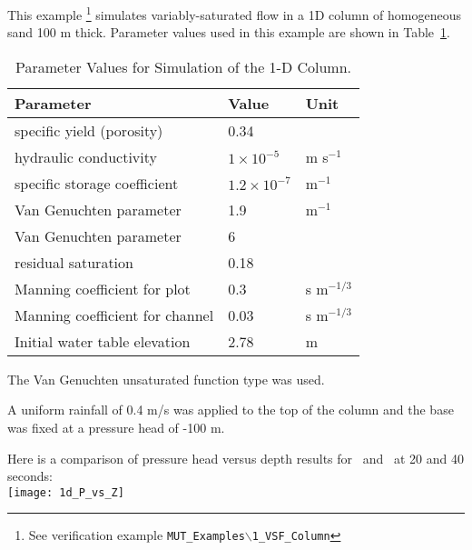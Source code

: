 \label{section:1d_column_example}
This example \footnote{See verification example   \texttt{MUT\_Examples$\backslash$1\_VSF\_Column}} simulates variably-saturated flow in a 1D column of homogeneous sand 100 m thick.
Parameter values used in this example are shown in Table~\ref{tab:column}.
    \begin{table}
        \centering
        \caption{Parameter Values for Simulation of the 1-D Column.}
        \begin{tabular}{lll}  \hline
            Parameter                             & Value & Unit                           \\ \hline
            specific yield (porosity)             &  0.34                    &             \\
            hydraulic conductivity                &  $ 1 \times 10^{-5}$     &m s$^{-1}$  \\
            specific storage coefficient          &  $ 1.2 \times 10^{-7}$   & m$^{-1}$   \\
            Van Genuchten parameter               &  1.9                     &m$^{-1}$     \\
            Van Genuchten parameter               &  6                       &             \\
            residual saturation                   &  0.18                    &             \\
            Manning coefficient for plot          &  0.3                     &s m$^{-1/3}$ \\
            Manning coefficient for channel       &  0.03                    &s m$^{-1/3}$ \\
            Initial water table elevation         &  2.78                    &m            \\
        \hline
        \end{tabular}
        \label{tab:column}
    \end{table}

The Van Genuchten unsaturated function type was used.

A uniform rainfall of 0.4 m/s was applied to the top of the column and the base was fixed at a pressure head of -100 m.

    \pagebreak
    Here is a comparison of pressure head versus depth results for  \mfus\ and \hgs\ at 20 and 40 seconds:
    \vspace{.2in} \\
    \texttt{[image: 1d\_P\_vs\_Z]}
    \vspace{.2in} \\

